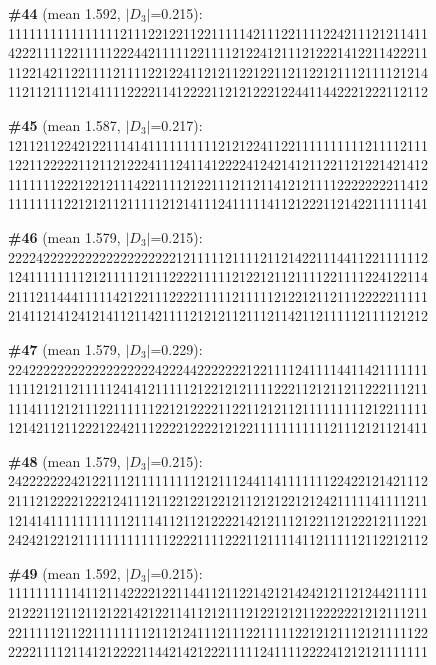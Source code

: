 \documentclass[10pt]{article}
\begin{document}
\noindent\textbf{\#44} (mean 1.592, $|D_3|$=0.215):\\
111111111111111121112212211221111142111221111224211121211411\\
422211112211111222442111112211112122412111212221412211422211\\
112214211221111211112212241121211221221121122121112111121214\\
112112111121411112222114122221121212221224411442221222112112\medskip

\noindent\textbf{\#45} (mean 1.587, $|D_3|$=0.217):\\
121121122421221114141111111111212122411221111111111211112111\\
122112222211211212224111241141222241242141211221121221421412\\
111111122212212111422111121221112112114121211112222222211412\\
111111112212121121111121214111241111141121222112142211111141\medskip

\noindent\textbf{\#46} (mean 1.579, $|D_3|$=0.215):\\
222242222222222222222222121111121111211214221114411221111112\\
124111111112121111121112222111112122121121111221111224122114\\
211121144411111421221112222111112111112122121121112222211111\\
214112141241214112114211112121211211121142112111112111121212\medskip

\noindent\textbf{\#47} (mean 1.579, $|D_3|$=0.229):\\
224222222222222222222422244222222212211112411114411421111111\\
111121211211111241412111112122121211112221121211211222111211\\
111411121211122111111221212222112211212112111111111212211111\\
121421121122212242111222212222121221111111111121112121121411\medskip

\noindent\textbf{\#48} (mean 1.579, $|D_3|$=0.215):\\
242222222421221112111111111212111244114111111122422121421112\\
211121222212221241112112212212212112121221212421111141111211\\
121414111111111112111411211212222142121112122112122212111221\\
242421221211111111111112222111122211211114112111112112212112\medskip

\noindent\textbf{\#49} (mean 1.592, $|D_3|$=0.215):\\
111111111141121142222122114411211221421214242121121244211111\\
212221121121121221421221141121211121221212112222221212111211\\
221111121122111111112112124111211122111112212121112121111122\\
222211112114121222211442142122211111241111222241212121111111\medskip
\end{document}

